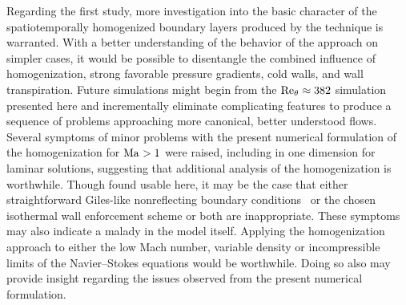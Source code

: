 Regarding the first study, more investigation into the basic character of the
spatiotemporally homogenized boundary layers produced by the
\citet{Topalian2014Spatiotemporal} technique is warranted.  With a better
understanding of the behavior of the approach on simpler cases, it would
be possible to disentangle the combined influence of homogenization, strong
favorable pressure gradients, cold walls, and wall transpiration.  Future
simulations might begin from the $\Reynolds[\theta]{}\approx{}382$ simulation
presented here and incrementally eliminate complicating features to produce a
sequence of problems approaching more canonical, better understood flows.
%
Several symptoms of minor problems with the present numerical formulation of the
homogenization for $\Mach>1$ were raised, including in one dimension for laminar
solutions, suggesting that additional analysis of the homogenization is
worthwhile.  Though found usable here, it may be the case that either
straightforward Giles-like nonreflecting boundary
conditions~\citep{Giles1988Nonreflecting,Giles1990Nonreflecting} or the chosen
isothermal wall enforcement scheme or both are inappropriate.  These symptoms
may also indicate a malady in the model itself.
%
Applying the homogenization approach to either the low Mach number,
variable density or incompressible limits of the Navier--Stokes equations
would be worthwhile.  Doing so also may provide insight regarding
the issues observed from the present numerical formulation.

